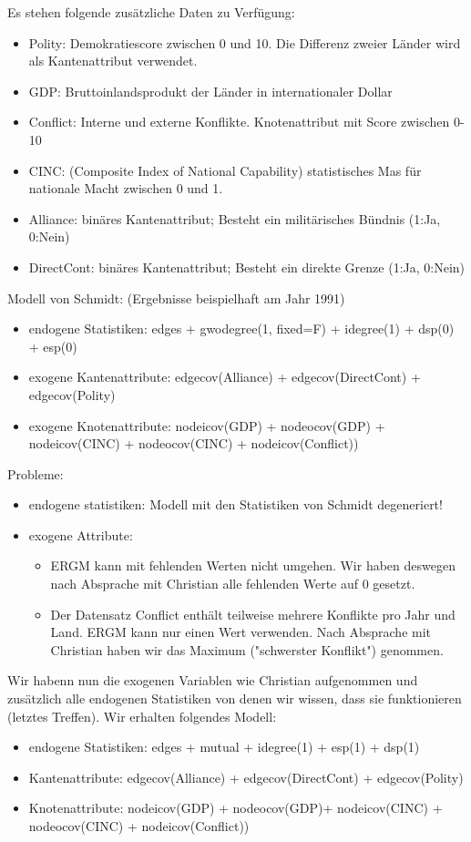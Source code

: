 \documentclass{article}
\begin{document}
Es stehen folgende zusätzliche Daten zu Verfügung:
\begin{itemize}
  \item Polity: Demokratiescore zwischen 0 und 10. Die Differenz zweier Länder wird als Kantenattribut verwendet.
  \item GDP: Bruttoinlandsprodukt der Länder in internationaler Dollar
  \item Conflict: Interne und externe Konflikte. Knotenattribut mit Score zwischen 0-10
  \item CINC: (Composite Index of National Capability) statistisches Mas für nationale Macht zwischen 0 und 1.
  \item Alliance: binäres Kantenattribut; Besteht ein militärisches Bündnis (1:Ja, 0:Nein)
  \item DirectCont: binäres Kantenattribut; Besteht ein direkte Grenze (1:Ja, 0:Nein)
\end{itemize}

Modell von Schmidt: (Ergebnisse beispielhaft am Jahr 1991)
\begin{itemize}
  \item endogene Statistiken: edges + gwodegree(1, fixed=F) + idegree(1) + dsp(0) + esp(0)
	\item exogene Kantenattribute: edgecov(Alliance) + edgecov(DirectCont)  + edgecov(Polity)
  \item exogene Knotenattribute: nodeicov(GDP) + nodeocov(GDP) + nodeicov(CINC) + nodeocov(CINC) + nodeicov(Conflict))
\end{itemize}

Probleme:
\begin{itemize}
\item endogene statistiken: Modell mit den Statistiken von Schmidt degeneriert!
\item exogene Attribute: 
  \begin{itemize} 
  \item ERGM kann mit fehlenden Werten nicht umgehen. Wir haben deswegen nach Absprache mit Christian alle fehlenden Werte auf 0 gesetzt.
  \item Der Datensatz Conflict enthält teilweise mehrere Konflikte pro Jahr und Land. ERGM kann nur einen Wert verwenden. Nach Absprache mit Christian haben wir das Maximum ("schwerster Konflikt") genommen.
  \end{itemize}
\end{itemize}

Wir habenn nun die exogenen Variablen wie Christian aufgenommen und zusätzlich alle endogenen Statistiken von denen wir wissen, dass sie funktionieren (letztes Treffen).
Wir erhalten folgendes Modell:
\begin{itemize}
\item endogene Statistiken: edges + mutual + idegree(1) + esp(1) + dsp(1)
\item Kantenattribute: edgecov(Alliance) + edgecov(DirectCont)  + edgecov(Polity)
\item Knotenattribute: nodeicov(GDP) + nodeocov(GDP)+ nodeicov(CINC) + nodeocov(CINC) + nodeicov(Conflict))
\end{itemize}
\end{document}
